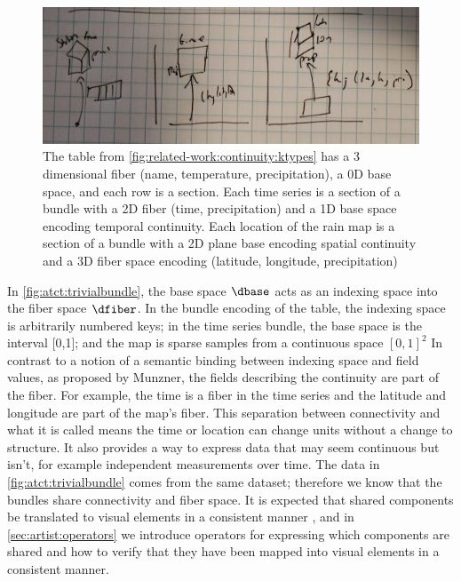 \documentclass[journal]{IEEEtran}
\theoremstyle{definition}
\theoremstyle{remark}
\begin{document}
\begin{figure}[H]
  \includegraphics[width=\columnwidth]{dbundle.png}
  \caption{The table from \autoref{fig:related-work:continuity:ktypes} has a 3 dimensional fiber (name, temperature, precipitation), a 0D base space, and each row is a section. Each time series is a section of a bundle with a 2D fiber (time, precipitation) and a 1D base space encoding temporal continuity. Each location of the rain map is a section of a bundle with a 2D plane base encoding spatial continuity and a 3D fiber space encoding (latitude, longitude, precipitation)
    \label{fig:atct:trivialbundle}}
\end{figure}

In \autoref{fig:atct:trivialbundle}, the base space $\dbase$ acts as an indexing space into the fiber space $\dfiber$. In the bundle encoding of the table, the indexing space is arbitrarily numbered keys; in the time series bundle, the base space is the interval [0,1]; and the map is sparse samples from a continuous space $[0,1]^{2}$ In contrast to a notion of a semantic binding between indexing space and field values, as proposed by Munzner\cite{munznerVisualizationAnalysisDesign2014}, the fields describing the continuity are part of the fiber. For example, the time is a fiber in the time series and the latitude and longitude are part of the map's fiber. This separation between connectivity and what it is called means the time or location can change units without a change to structure. It also provides a way to express data that may seem continuous but isn't, for example independent measurements over time. The data in \autoref{fig:atct:trivialbundle} comes from the same dataset; therefore we know that the bundles share connectivity and fiber space. It is expected that shared components be translated to visual elements in a consistent manner \cite{hullmanKeeping2018}, and in \autoref{sec:artist:operators} we introduce operators for expressing which components are shared and how to verify that they have been mapped into visual elements in a consistent manner. 
\end{document}
